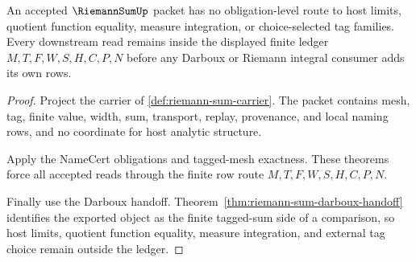\begin{theorem}
\label{thm:riemann-sum-ledger-nonescape-obligation}
An accepted $\RiemannSumUp$ packet has no obligation-level route to host limits, quotient function equality, measure integration, or choice-selected tag families. Every downstream read remains inside the displayed finite ledger $M,T,F,W,S,H,C,P,N$ before any Darboux or Riemann integral consumer adds its own rows.
\end{theorem}
\begin{proof}
Project the carrier of \autoref{def:riemann-sum-carrier}. The packet contains mesh, tag, finite value, width, sum, transport, replay, provenance, and local naming rows, and no coordinate for host analytic structure.

Apply the NameCert obligations and tagged-mesh exactness. These theorems force all accepted reads through the finite row route $M,T,F,W,S,H,C,P,N$.

Finally use the Darboux handoff. Theorem~\ref{thm:riemann-sum-darboux-handoff} identifies the exported object as the finite tagged-sum side of a comparison, so host limits, quotient function equality, measure integration, and external tag choice remain outside the ledger.
\end{proof}

